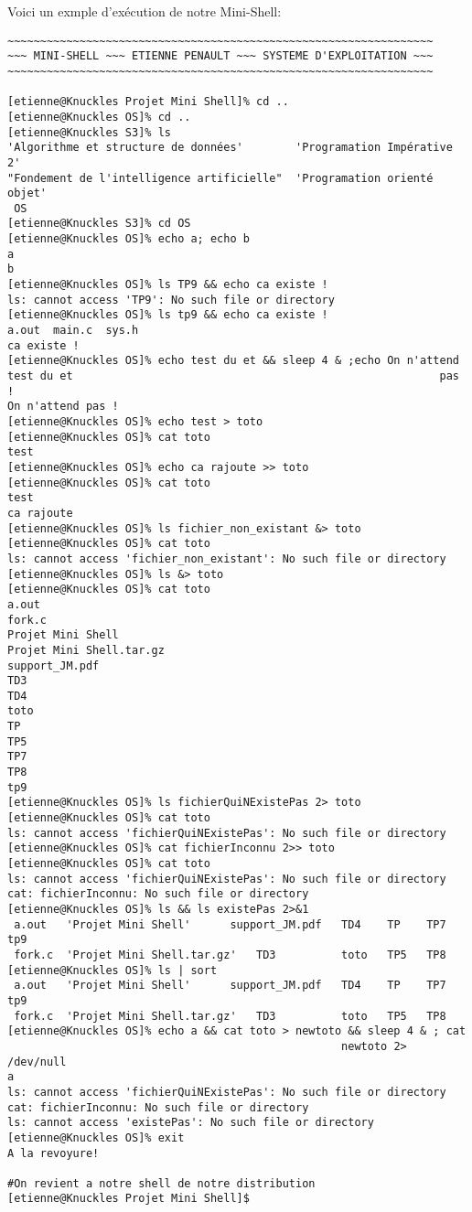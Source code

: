 \documentclass [12pt]{article}
\begin{document}
Voici un exmple d'exécution de notre Mini-Shell:
\begin{verbatim}
~~~~~~~~~~~~~~~~~~~~~~~~~~~~~~~~~~~~~~~~~~~~~~~~~~~~~~~~~~~~~~~~~
~~~ MINI-SHELL ~~~ ETIENNE PENAULT ~~~ SYSTEME D'EXPLOITATION ~~~
~~~~~~~~~~~~~~~~~~~~~~~~~~~~~~~~~~~~~~~~~~~~~~~~~~~~~~~~~~~~~~~~~

[etienne@Knuckles Projet Mini Shell]% cd ..
[etienne@Knuckles OS]% cd ..
[etienne@Knuckles S3]% ls
'Algorithme et structure de données'	    'Programation Impérative 2'
"Fondement de l'intelligence artificielle"  'Programation orienté objet'
 OS
[etienne@Knuckles S3]% cd OS
[etienne@Knuckles OS]% echo a; echo b
a
b
[etienne@Knuckles OS]% ls TP9 && echo ca existe !
ls: cannot access 'TP9': No such file or directory
[etienne@Knuckles OS]% ls tp9 && echo ca existe !
a.out  main.c  sys.h
ca existe !
[etienne@Knuckles OS]% echo test du et && sleep 4 & ;echo On n'attend 
test du et                                                        pas !
On n'attend pas !
[etienne@Knuckles OS]% echo test > toto
[etienne@Knuckles OS]% cat toto
test
[etienne@Knuckles OS]% echo ca rajoute >> toto
[etienne@Knuckles OS]% cat toto
test
ca rajoute
[etienne@Knuckles OS]% ls fichier_non_existant &> toto
[etienne@Knuckles OS]% cat toto
ls: cannot access 'fichier_non_existant': No such file or directory
[etienne@Knuckles OS]% ls &> toto
[etienne@Knuckles OS]% cat toto
a.out
fork.c
Projet Mini Shell
Projet Mini Shell.tar.gz
support_JM.pdf
TD3
TD4
toto
TP
TP5
TP7
TP8
tp9
[etienne@Knuckles OS]% ls fichierQuiNExistePas 2> toto
[etienne@Knuckles OS]% cat toto
ls: cannot access 'fichierQuiNExistePas': No such file or directory
[etienne@Knuckles OS]% cat fichierInconnu 2>> toto
[etienne@Knuckles OS]% cat toto
ls: cannot access 'fichierQuiNExistePas': No such file or directory
cat: fichierInconnu: No such file or directory
[etienne@Knuckles OS]% ls && ls existePas 2>&1
 a.out	 'Projet Mini Shell'	  support_JM.pdf   TD4    TP    TP7   tp9
 fork.c  'Projet Mini Shell.tar.gz'   TD3	       toto   TP5   TP8
[etienne@Knuckles OS]% ls | sort
 a.out	 'Projet Mini Shell'	  support_JM.pdf   TD4    TP    TP7   tp9
 fork.c  'Projet Mini Shell.tar.gz'   TD3	       toto   TP5   TP8
[etienne@Knuckles OS]% echo a && cat toto > newtoto && sleep 4 & ; cat 
                                                   newtoto 2> /dev/null
a
ls: cannot access 'fichierQuiNExistePas': No such file or directory
cat: fichierInconnu: No such file or directory
ls: cannot access 'existePas': No such file or directory
[etienne@Knuckles OS]% exit
A la revoyure!

#On revient a notre shell de notre distribution
[etienne@Knuckles Projet Mini Shell]$
\end{verbatim}
\end{document}
